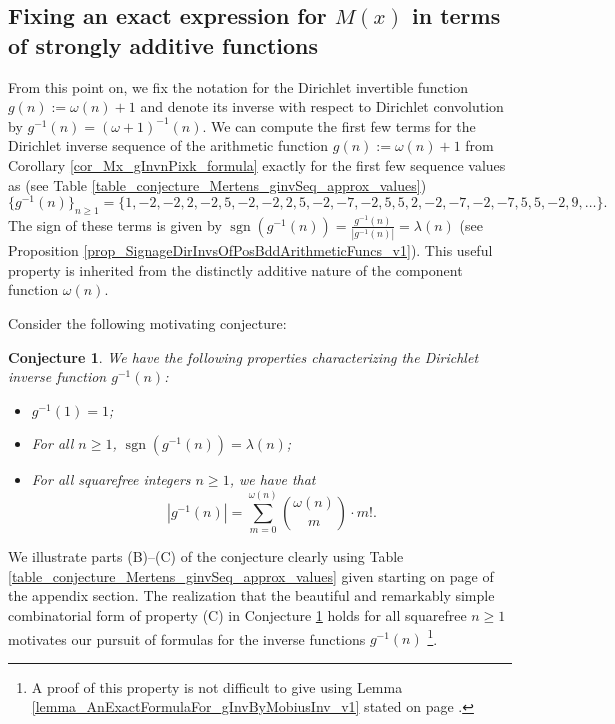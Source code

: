 \documentclass[11pt,reqno,a4letter]{article}
\numberwithin{figure}{section}
\numberwithin{table}{section}
\theoremstyle{plain}
\newtheorem{conjecture}[theorem]{Conjecture}
\numberwithin{theorem}{section}
\theoremstyle{definition}
\newcommand{\NBRef}[1]{}
\begin{document}
\subsection{Fixing an exact expression for $M(x)$ in terms of strongly additive functions} 
\label{example_InvertingARecRelForMx_Intro}

From this point on, we fix the notation for the Dirichlet invertible function $g(n) := \omega(n) + 1$ and denote its 
inverse with respect to Dirichlet convolution by $g^{-1}(n) = (\omega+1)^{-1}(n)$. 
We can compute the first few terms for the
Dirichlet inverse sequence of the arithmetic function 
$g(n) := \omega(n) + 1$ from 
Corollary \ref{cor_Mx_gInvnPixk_formula} 
exactly for the first few sequence values as 
(see Table \ref{table_conjecture_Mertens_ginvSeq_approx_values}) 
\[
\{g^{-1}(n)\}_{n \geq 1} = \{1, -2, -2, 2, -2, 5, -2, -2, 2, 5, -2, -7, -2, 5, 5, 2, -2, -7, -2, 
     -7, 5, 5, -2, 9, \ldots \}. 
\] 
The sign of these terms is given by $\operatorname{sgn}(g^{-1}(n)) = \frac{g^{-1}(n)}{|g^{-1}(n)|} = \lambda(n)$ 
(see Proposition \ref{prop_SignageDirInvsOfPosBddArithmeticFuncs_v1}). 
This useful property is inherited from the distinctly 
additive nature of the component function $\omega(n)$. 

Consider the following motivating conjecture: 
\NBRef{A01-2020-04-26}

\begin{conjecture}
\label{lemma_gInv_MxExample} 
We have the following properties characterizing the 
Dirichlet inverse function $g^{-1}(n)$: 
\begin{itemize} 

\item[(A)] $g^{-1}(1) = 1$; 
\item[(B)] For all $n \geq 1$, $\operatorname{sgn}(g^{-1}(n)) = \lambda(n)$; 
\item[(C)] For all squarefree integers $n \geq 1$, we have that 
     \[
     |g^{-1}(n)| = \sum_{m=0}^{\omega(n)} \binom{\omega(n)}{m} \cdot m!. 
     \]
\end{itemize} 
\end{conjecture} 

We illustrate parts (B)--(C) of the conjecture clearly using 
Table \ref{table_conjecture_Mertens_ginvSeq_approx_values} given starting on 
page \pageref{table_conjecture_Mertens_ginvSeq_approx_values} of the appendix section. 
The realization that the beautiful and remarkably simple combinatorial form of property (C) 
in Conjecture \ref{lemma_gInv_MxExample} holds for all squarefree $n \geq 1$ 
motivates our pursuit of formulas for the inverse functions $g^{-1}(n)$ \footnote{ 
     A proof of this property is not difficult to give using 
     Lemma \ref{lemma_AnExactFormulaFor_gInvByMobiusInv_v1} 
     stated on page \pageref{lemma_AnExactFormulaFor_gInvByMobiusInv_v1}. 
}. 
\end{document}
